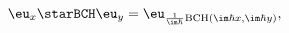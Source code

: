 \begin{equation}
    \label{eq:exeyebch}
    \eu_x \starBCH \eu_y 
    = \eu_{\frac{1}{\im\hbar} \mathrm{BCH}(\im\hbar x, \im\hbar y)},
\end{equation}

